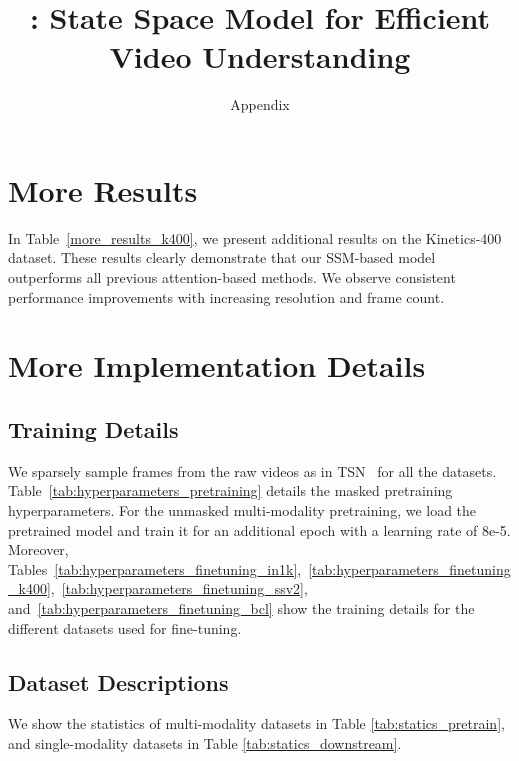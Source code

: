 \appendix
\renewcommand{\thetable}{\Roman{table}}
\renewcommand{\thefigure}{\Roman{figure}}


\title{\logo\ModelName: State Space Model for Efficient Video Understanding}
\author{\Large{Appendix}}

\maketitle



\section{More Results}

In Table~\ref{more_results_k400}, 
we present additional results on the Kinetics-400 dataset. 
These results clearly demonstrate that our SSM-based model outperforms all previous attention-based methods. 
We observe consistent performance improvements with increasing resolution and frame count.












\section{More Implementation Details}

\subsection{Training Details}

 
We sparsely sample frames from the raw videos as in TSN~\cite{tsn} for all the datasets. 
Table~\ref{tab:hyperparameters_pretraining} details the masked pretraining hyperparameters.
For the unmasked multi-modality pretraining, we load the pretrained model and train it for an additional epoch with a learning rate of 8e-5. 
Moreover,
Tables~\ref{tab:hyperparameters_finetuning_in1k},~\ref{tab:hyperparameters_finetuning_k400},~\ref{tab:hyperparameters_finetuning_ssv2}, and~\ref{tab:hyperparameters_finetuning_bcl} show the training details for the different datasets used for fine-tuning.


\subsection{Dataset Descriptions}




We show the statistics of multi-modality datasets in Table \ref{tab:statics_pretrain},
and single-modality datasets in Table \ref{tab:statics_downstream}.